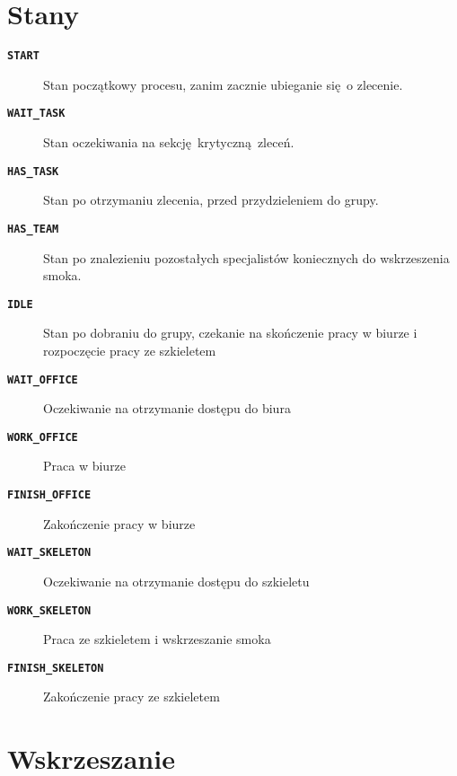 \documentclass[12pt]{article}
\newcommand{\state}[1]{\texttt{\textbf{#1}}}
\begin{document}
\section{Stany}
\begin{description}
	\item[\state{START}] Stan początkowy procesu, zanim zacznie ubieganie się o zlecenie.
	\item[\state{WAIT\_TASK}] Stan oczekiwania na sekcję krytyczną zleceń.
	\item[\state{HAS\_TASK}] Stan po otrzymaniu zlecenia, przed przydzieleniem do grupy.
	\item[\state{HAS\_TEAM}] Stan po znalezieniu pozostałych specjalistów koniecznych do wskrzeszenia smoka.
	
	\item[\state{IDLE}] Stan po dobraniu do grupy, czekanie na skończenie pracy w biurze i rozpoczęcie pracy ze szkieletem
	\item[\state{WAIT\_OFFICE}] Oczekiwanie na otrzymanie dostępu do biura
	\item[\state{WORK\_OFFICE}] Praca w biurze
	\item[\state{FINISH\_OFFICE}] Zakończenie pracy w biurze
	
	\item[\state{WAIT\_SKELETON}] Oczekiwanie na otrzymanie dostępu do szkieletu
	\item[\state{WORK\_SKELETON}] Praca ze szkieletem i wskrzeszanie smoka
	\item[\state{FINISH\_SKELETON}] Zakończenie pracy ze szkieletem
\end{description}

\section{Wskrzeszanie}
\end{document}
